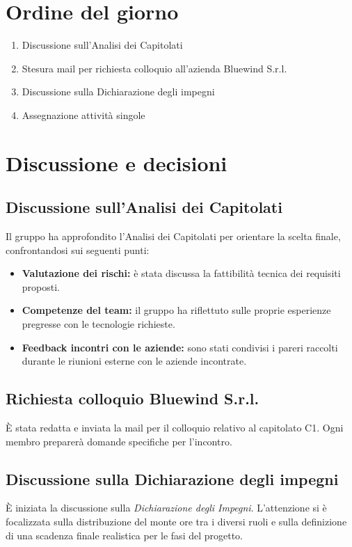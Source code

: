 \documentclass[a4paper, 10pt, colorlinks=true, linkcolor=black, urlcolor=blue, citecolor=blue, hidelinks]{article}
\begin{document}
\section{Ordine del giorno}
\begin{enumerate}
    \item Discussione sull'Analisi dei Capitolati
    \item Stesura mail per richiesta colloquio all'azienda Bluewind S.r.l.
    \item Discussione sulla Dichiarazione degli impegni
    \item Assegnazione attività singole
\end{enumerate}

\section{Discussione e decisioni}
\subsection{Discussione sull'Analisi dei Capitolati}
Il gruppo ha approfondito l'Analisi dei Capitolati per orientare la scelta finale, confrontandosi sui seguenti punti:
\begin{itemize}
    \item \textbf{Valutazione dei rischi:} è stata discussa la fattibilità tecnica dei requisiti proposti.
    \item \textbf{Competenze del team:} il gruppo ha riflettuto sulle proprie esperienze pregresse con le tecnologie richieste.
    \item \textbf{Feedback incontri con le aziende:} sono stati condivisi i pareri raccolti durante le riunioni esterne con le aziende incontrate.
\end{itemize}

\subsection{Richiesta colloquio Bluewind S.r.l.}
È stata redatta e inviata la mail per il colloquio relativo al capitolato C1. Ogni membro preparerà domande specifiche per l'incontro.

\subsection{Discussione sulla Dichiarazione degli impegni}
È iniziata la discussione sulla \textit{Dichiarazione degli Impegni}. L'attenzione si è focalizzata sulla distribuzione del monte ore tra i diversi ruoli e sulla definizione di una scadenza finale realistica per le fasi del progetto.
\end{document}
